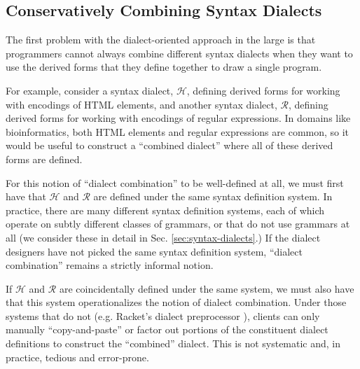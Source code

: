 \subsection{Conservatively Combining Syntax Dialects}
The first problem with the dialect-oriented approach in the large is that programmers cannot always combine different syntax dialects when they want to use the derived forms that they define together to draw a single program.

For example, consider a syntax dialect, $\mathcal{H}$, defining derived forms for working with encodings of HTML elements, and another syntax dialect, $\mathcal{R}$,  defining derived forms for working with encodings of regular expressions. In domains like bioinformatics, both HTML elements and regular expressions are common, so it would be useful to construct a ``combined dialect'' where all of these derived forms are defined. 

For this notion of ``dialect combination'' to be well-defined at all, we must first have that $\mathcal{H}$ and $\mathcal{R}$ are defined under the same syntax definition system. In practice, there are many different syntax definition systems, each of which operate on subtly different classes of grammars, or that do not use grammars at all (we consider these in detail in Sec. \ref{sec:syntax-dialects}.) If the dialect designers  have not  picked the same syntax definition system, ``dialect combination'' remains a strictly informal notion.%

If $\mathcal{H}$ and $\mathcal{R}$ are coincidentally defined under the same system, we must also have that this system operationalizes the notion of dialect combination. Under those systems that do not (e.g. Racket's dialect preprocessor \cite{Flatt:2012:CLR:2063176.2063195}), clients can only manually  ``copy-and-paste'' or factor out portions of the constituent dialect definitions to construct the ``combined'' dialect. This is not systematic and, in practice, tedious and error-prone.%


